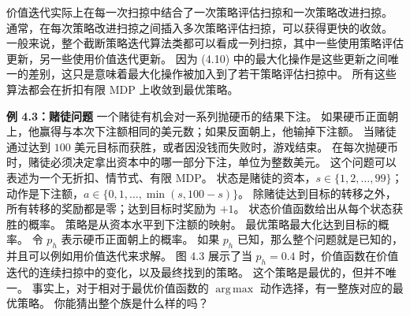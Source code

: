 \documentclass[UTF8, 12pt, fontset=fandol, oneside]{ctexart}
\begin{document}
\begin{center}
\end{center}

价值迭代实际上在每一次扫掠中结合了一次策略评估扫掠和一次策略改进扫掠。
通常，在每次策略改进扫掠之间插入多次策略评估扫掠，可以获得更快的收敛。
一般来说，整个截断策略迭代算法类都可以看成一列扫掠，其中一些使用策略评估更新，另一些使用价值迭代更新。
因为 (4.10) 中的最大化操作是这些更新之间唯一的差别，这只是意味着最大化操作被加入到了若干策略评估扫掠中。
所有这些算法都会在折扣有限 MDP 上收敛到最优策略。

\noindent\textbf{例 4.3：赌徒问题}
一个赌徒有机会对一系列抛硬币的结果下注。
如果硬币正面朝上，他赢得与本次下注额相同的美元数；如果反面朝上，他输掉下注额。
当赌徒通过达到 $100$ 美元目标而获胜，或者因没钱而失败时，游戏结束。
在每次抛硬币时，赌徒必须决定拿出资本中的哪一部分下注，单位为整数美元。
这个问题可以表述为一个无折扣、情节式、有限 MDP。
状态是赌徒的资本，$s\in\{1,2,\ldots,99\}$；动作是下注额，$a\in\{0,1,\ldots,\min(s,100-s)\}$。
除赌徒达到目标的转移之外，所有转移的奖励都是零；达到目标时奖励为 $+1$。
状态价值函数给出从每个状态获胜的概率。
策略是从资本水平到下注额的映射。
最优策略最大化达到目标的概率。
令 $p_h$ 表示硬币正面朝上的概率。
如果 $p_h$ 已知，那么整个问题就是已知的，并且可以例如用价值迭代来求解。
图 4.3 展示了当 $p_h=0.4$ 时，价值函数在价值迭代的连续扫掠中的变化，以及最终找到的策略。
这个策略是最优的，但并不唯一。
事实上，对于相对于最优价值函数的 $\operatorname*{arg\,max}$ 动作选择，有一整族对应的最优策略。
你能猜出整个族是什么样的吗？
\end{document}
